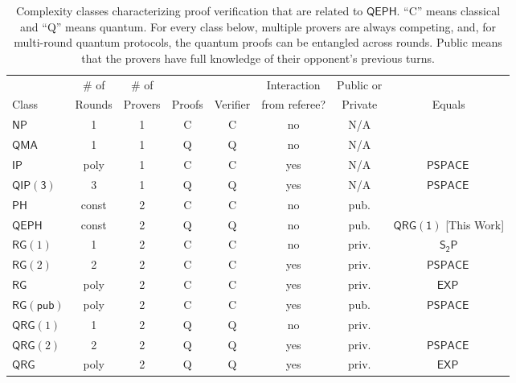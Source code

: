 \documentclass[10pt,a4paper]{article}
\theoremstyle{definition}
\newcommand{\class}[1]{\ensuremath{\mathsf{#1}}\xspace}
\newcommand{\NP}{\class{NP}}
\newcommand{\EXP}{\class{EXP}}
\newcommand{\IP}{\class{IP}}
\newcommand{\PSPACE}{\class{PSPACE}}
\newcommand{\QMA}{\class{QMA}}
\newcommand{\QIP}{\class{QIP}}
\newcommand{\QRG}{\class{QRG}}
\newcommand{\QRGk}[1][k]{\class{QRG(#1)}}
\newcommand{\QRGone}{\QRGk[1]}
\newcommand{\RG}{\class{RG}}
\newcommand{\PH}{\class{PH}}
\newcommand{\QEPH}{\class{QEPH}}
\begin{document}
\begin{table}[ht]
    \centering
    \caption{Complexity classes characterizing proof verification that are related to $\QEPH$. ``C'' means classical and ``Q'' means quantum. For every class below, multiple provers are always competing, and, for multi-round quantum protocols, the quantum proofs can be entangled across rounds. Public means that the provers have full knowledge of their opponent's previous turns.}
    \label{table:classes}
    \begin{tabular}
    {
        l
        S[table-format = 2]
        S[table-format = 2]
        S[table-format = 2]
        S[table-format = 2]
        S[table-format = 2]
        S[table-format = 2]
        S[table-format = 2]
        }
        \toprule
              & {\# of } & {\# of}   & {}       & {}         & {Interaction}            & {Public or}      &  {} \\
        Class & {Rounds} & {Provers} & {Proofs} & {Verifier} & {from referee?} & {Private} & {Equals} \\
        \midrule
        {$\NP$} & {1} & {1} & {C} & {C} & {no} & {N/A} & {} \\
        {$\QMA$} & {1} & {1} & {Q} & {Q} & {no} & {N/A} & {} \\
        {$\IP$} & {poly} & {1} & {C} &{C} & {yes} & {N/A} & {$\PSPACE\,$ \cite{shamir1992ip}} \\
        {$\QIP\mathsf{(3)}$} & {3} & {1} & {Q} &{Q} & {yes} & {N/A} & {$\PSPACE\,$\cite{jain2011qip}} \\
        \midrule 
        {$\PH$} & {const} & {2} & {C} & {C} & {no} & {pub.} & {} \\
        {$\QEPH$} & {const} & {2} & {Q} & {Q} & {no} & {pub.} & {$\QRGone$ [This Work]} \\
        {$\RG(1)$} & {1} & {2} & {C} &{C} & {no} & {priv.} & {$\mathsf{S_2P}$\cite{ALTHOFER1994339,lipton1994simple}} \\
        {$\RG(2)$} & {2} & {2} & {C} &{C} & {yes} & {priv.} & {$\PSPACE\,$\cite{feige1997making}} \\
        {$\RG$} & {poly} & {2} & {C} &{C} & {yes} & {priv.} & {$\EXP\,$\cite{feige1997making}} \\
        {$\RG\mathsf{(pub)}$} & {poly} & {2} & {C} &{C} & {yes} & {pub.} & {$\PSPACE\,$\cite{feige1997making}} \\
        {$\QRG(1)$} & {1} & {2} & {Q} &{Q} & {no} & {priv.} &  \\
        {$\QRG(2)$} & {2} & {2} & {Q} &{Q} & {yes} & {priv.} & {$\PSPACE\,$\cite{gutoski2013parallel}} \\
        {$\QRG$} & {poly} & {2} & {Q} &{Q} & {yes} & {priv.} & {$\EXP\,$\cite{gutoski2007toward}} \\
        \bottomrule
    \end{tabular}
\end{table}
\end{document}
